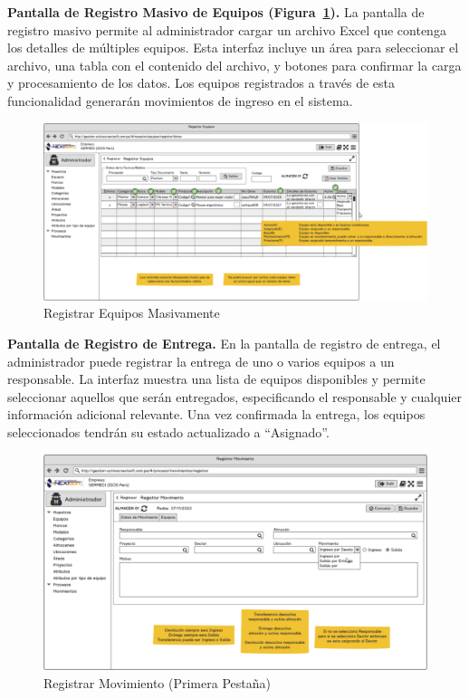 \documentclass[stu, 12pt, letterpaper, donotrepeattitle, floatsintext, natbib]{apa7}
\begin{document}
\textbf{Pantalla de Registro Masivo de Equipos (Figura~\ref{masivo}). }La pantalla de registro masivo permite al administrador cargar un archivo Excel que contenga los detalles de m\'ultiples equipos. Esta interfaz incluye un \'area para seleccionar el archivo, una tabla con el contenido del archivo, y botones para confirmar la carga y procesamiento de los datos. Los equipos registrados a trav\'es de esta funcionalidad generar\'an movimientos de ingreso en el sistema.
\begin{figure}[H]
    \centering
    \caption{Registrar Equipos Masivamente}\label{masivo}
    \includegraphics[width=16.5cm, angle=0]{./images/registroMasivo.png}
\end{figure}
\textbf{Pantalla de Registro de Entrega. }En la pantalla de registro de entrega, el administrador puede registrar la entrega de uno o varios equipos a un responsable. La interfaz muestra una lista de equipos disponibles y permite seleccionar aquellos que ser\'an entregados, especificando el responsable y cualquier informaci\'on adicional relevante. Una vez confirmada la entrega, los equipos seleccionados tendr\'an su estado actualizado a ``Asignado''.
\begin{figure}[H]
    \centering
    \caption{Registrar Movimiento (Primera Pesta\~{n}a)}\label{movimiento1}
    \includegraphics[width=16.5cm, angle=0]{./images/registrarMovimiento.png}
\end{figure}
\end{document}
